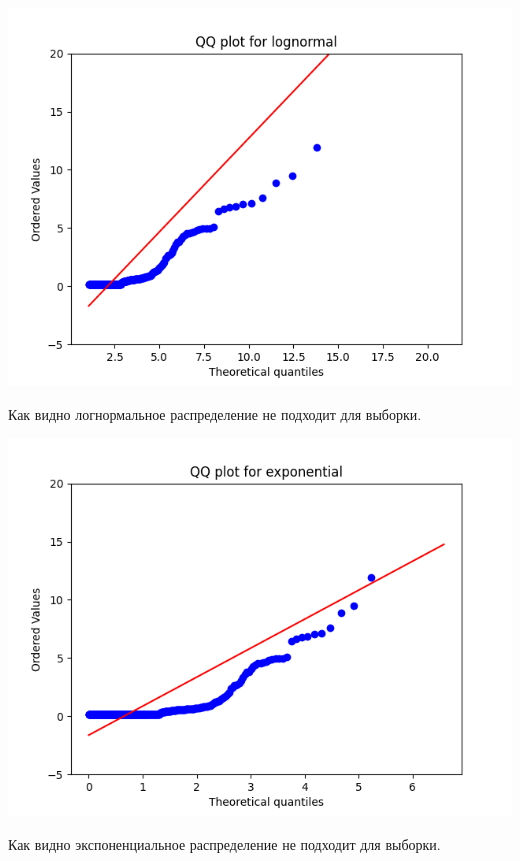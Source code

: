 \documentclass[reprint, amsmath, amssymb, aps,]{revtex4-2}
\begin{document}
\begin{center}
\centering 
\includegraphics[scale=0.6]{Exercise32.png}
\end{center}
Как видно логнормальное распределение не подходит для выборки.

\begin{center}
\centering 
\includegraphics[scale=0.6]{Exercise33.png}
\end{center}

Как видно экспоненциальное распределение не подходит для выборки.
\end{document}
